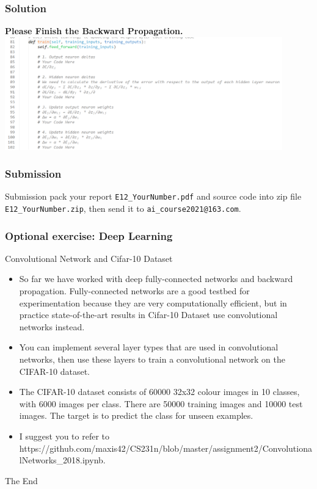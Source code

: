 \documentclass{beamer}
\begin{document}
\begin{frame}
  \frametitle{Solution}
	  \textbf{Please Finish the Backward Propagation.}
      \\[10pt]
      \includegraphics[width=0.9\textwidth]{Pic/bp.png}

\end{frame}


\begin{frame}
  \frametitle{Submission}
  \begin{block}{Submission}
    pack your report \texttt{E12\_YourNumber.pdf} and source code into zip file \texttt{E12\_YourNumber.zip}, then send it to \texttt{ai\_course2021@163.com}.
  \end{block}
\end{frame}

\begin{frame}
  \frametitle{Optional exercise: Deep Learning}
  \begin{block}{Convolutional Network and Cifar-10 Dataset}
    \begin{itemize}
    \item 
    So far we have worked with deep fully-connected networks and backward propagation. Fully-connected networks are a good testbed for experimentation because they are very computationally efficient, but in practice state-of-the-art results in Cifar-10 Dataset use convolutional networks instead.
    \item 
You can implement several layer types that are used in convolutional networks, then use these layers to train a convolutional network on the CIFAR-10 dataset.
    \item The CIFAR-10 dataset consists of 60000 32x32 colour images in 10 classes, with 6000 images per class. There are 50000 training images and 10000 test images. The target is to predict the class for unseen examples.\\
    \item I suggest you to refer to https://github.com/maxis42/CS231n/blob/master/assignment2/ConvolutionalNetworks\_2018.ipynb.
    \end{itemize}

  \end{block}
\end{frame}


\begin{frame}
  \Huge{\centerline{The End}}
\end{frame}

\end{document}
